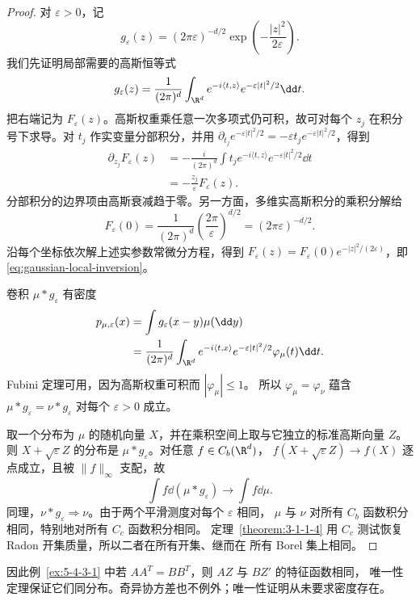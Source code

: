 \begin{proof}
对 $\varepsilon>0$，记
\[
 g_\varepsilon(z)=(2\pi\varepsilon)^{-d/2}
 \exp\left(-\frac{|z|^2}{2\varepsilon}\right).
\]
我们先证明局部需要的高斯恒等式
\begin{equation}\label{eq:gaussian-local-inversion}
 g_\varepsilon(z)=\frac1{(2\pi)^d}
 \int_{\R^d}e^{-i\langle t,z\rangle}
 e^{-\varepsilon|t|^2/2}\dd t.
\end{equation}
把右端记为 $F_\varepsilon(z)$。高斯权重乘任意一次多项式仍可积，故可对每个
$z_j$ 在积分号下求导。对 $t_j$ 作实变量分部积分，并用
$\partial_{t_j}e^{-\varepsilon|t|^2/2}=-\varepsilon t_j
e^{-\varepsilon|t|^2/2}$，得到
\begin{align*}
 \partial_{z_j}F_\varepsilon(z)
 &=-\frac{i}{(2\pi)^d}\int t_j e^{-i\langle t,z\rangle}
 e^{-\varepsilon|t|^2/2}\dd t\\
 &=-\frac{z_j}{\varepsilon}F_\varepsilon(z).
\end{align*}
分部积分的边界项由高斯衰减趋于零。另一方面，多维实高斯积分的乘积分解给
\[
 F_\varepsilon(0)
 =\frac1{(2\pi)^d}\left(\frac{2\pi}{\varepsilon}\right)^{d/2}
 =(2\pi\varepsilon)^{-d/2}.
\]
沿每个坐标依次解上述实参数常微分方程，得到
$F_\varepsilon(z)=F_\varepsilon(0)e^{-|z|^2/(2\varepsilon)}$，即
\eqref{eq:gaussian-local-inversion}。

卷积 $\mu*g_\varepsilon$ 有密度
\begin{align*}
 p_{\mu,\varepsilon}(x)
 &=\int g_\varepsilon(x-y)\mu(\dd y)\\
 &=\frac1{(2\pi)^d}\int_{\R^d}
 e^{-i\langle t,x\rangle}e^{-\varepsilon|t|^2/2}
 \varphi_\mu(t)\dd t.
\end{align*}
Fubini 定理可用，因为高斯权重可积而 $|\varphi_\mu|\leq1$。
所以 $\varphi_\mu=\varphi_\nu$ 蕴含
$\mu*g_\varepsilon=\nu*g_\varepsilon$ 对每个 $\varepsilon>0$ 成立。

取一个分布为 $\mu$ 的随机向量 $X$，并在乘积空间上取与它独立的标准高斯向量 $Z$。
则 $X+\sqrt\varepsilon Z$ 的分布是 $\mu*g_\varepsilon$。对任意 $f\in C_b(\R^d)$，
$f(X+\sqrt\varepsilon Z)\to f(X)$ 逐点成立，且被 $\|f\|_\infty$ 支配，故
\[
 \int f\dd(\mu*g_\varepsilon)\longrightarrow\int f\dd\mu.
\]
同理，$\nu*g_\varepsilon\Rightarrow\nu$。由于两个平滑测度对每个 $\varepsilon$ 相同，
$\mu$ 与 $\nu$ 对所有 $C_b$ 函数积分相同，特别地对所有 $C_c$ 函数积分相同。
定理~\ref{theorem:3-1-1-4} 用 $C_c$ 测试恢复 Radon 开集质量，所以二者在所有开集、继而在
所有 Borel 集上相同。
\end{proof}

因此例~\ref{ex:5-4-3-1} 中若 $AA^T=BB^T$，则 $AZ$ 与 $BZ'$ 的特征函数相同，
唯一性定理保证它们同分布。奇异协方差也不例外；唯一性证明从未要求密度存在。

